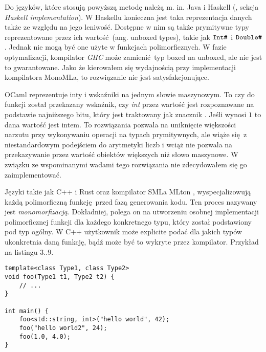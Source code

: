 \documentclass[declaration,shortabstract]{iithesis}
\begin{document}
Do języków, które stosują powyższą metodę należą m. in. Java 
\cite{type_erasure} i Haskell 
(\cite{haskell_poly}, sekcja \textit{Haskell implementation}).
W Haskellu konieczna jest taka reprezentacja danych także ze względu na jego 
leniwość. Dostępne w nim są także prymitywne typy reprezentowane przez 
ich wartość (ang. unboxed types), takie jak $\verb!Int#!$ i 
$\verb!Double#!$. Jednak nie mogą być one użyte w funkcjach polimorficznych. 
W fazie optymalizacji, kompilator \textit{GHC} może zamienić typ boxed 
na unboxed, ale nie jest to gwarantowane. Jako że kierowałem się wydajnością
przy implementacji kompilatora MonoMLa, to rozwiązanie nie jest 
satysfakcjonujące.

OCaml reprezentuje inty i wskaźniki na jednym słowie 
maszynowym. To czy do funkcji został przekazany wskaźnik, czy \textit{int}
przez wartość jest rozpoznawane na podstawie najniższego bitu, który jest 
traktowany jak znacznik \cite{ocaml_31bit}. Jeśli wynosi $1$ to dana wartość jest intem.
To rozwiązania pozwala na uniknięcie większości narzutu przy wykonywaniu 
operacji na typach prymitywnych, ale wiąże się z niestandardowym podejściem do 
arytmetyki liczb i wciąż nie pozwala na przekazywanie przez wartość obiektów 
większych niż słowo maszynowe. W związku ze wspominanymi wadami tego 
rozwiązania nie zdecydowałem się go zaimplementować.

Języki takie jak C++ i Rust oraz kompilator SMLa 
MLton \cite{mono_mlton}, wyspecjalizowują każdą polimorficzną funkcję przed 
fazą generowania 
kodu. Ten proces nazywany jest \textit{monomorfizacją}. Dokładniej, polega on na 
utworzeniu osobnej 
implementacji polimorficznej funkcji dla każdego konkretnego typu, który 
został 
podstawiony pod typ ogólny. W C++ użytkownik może explicite podać 
dla jakich typów ukonkretnia daną funkcję, bądź może być to wykryte przez 
kompilator. Przykład na listingu $3..9$.

\begin{lstlisting}[frame=single, caption={Polimorficzna funkcja w 
C++ z użyciem szablonów (ang. template)}]
template<class Type1, class Type2>
void foo(Type1 t1, Type2 t2) {
    // ...
}

int main() {
    foo<std::string, int>("hello world", 42);
    foo("hello world2", 24);
    foo(1.0, 4.0);
}
\end{lstlisting}
\end{document}
